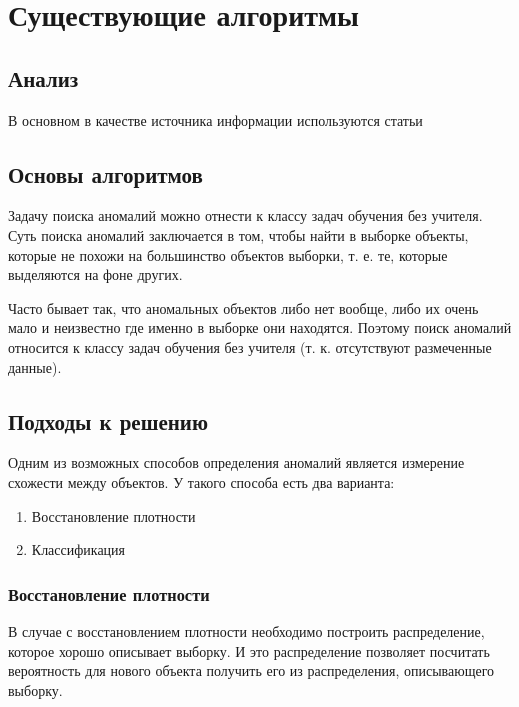 \chapter{Существующие алгоритмы} \label{ch:ch2}

\section{Анализ} \label{sec:ch2/sec1}

В основном в качестве источника информации используются статьи \cite{dai, hodge, vakili, varun, billor, wilkinson}

\section{Основы алгоритмов} \label{sec:ch2/sec1}

Задачу поиска аномалий можно отнести к классу задач обучения без учителя. Суть поиска аномалий заключается в том, чтобы найти в выборке объекты, которые не похожи на большинство объектов выборки, т. е. те, которые выделяются на фоне других.

Часто бывает так, что аномальных объектов либо нет вообще, либо их очень мало и неизвестно где именно в выборке они находятся. Поэтому поиск аномалий относится к классу задач обучения без учителя (т. к. отсутствуют размеченные данные).

\section{Подходы к решению} \label{sec:ch2/sec2}

Одним из возможных способов определения аномалий является измерение схожести между объектов. У такого способа есть два варианта:
\begin{enumerate}
  \item Восстановление плотности
  \item Классификация
\end{enumerate}

\subsection{Восстановление плотности}

В случае с восстановлением плотности необходимо построить распределение, которое хорошо описывает выборку. И это распределение позволяет посчитать вероятность для нового объекта получить его из распределения, описывающего выборку.

